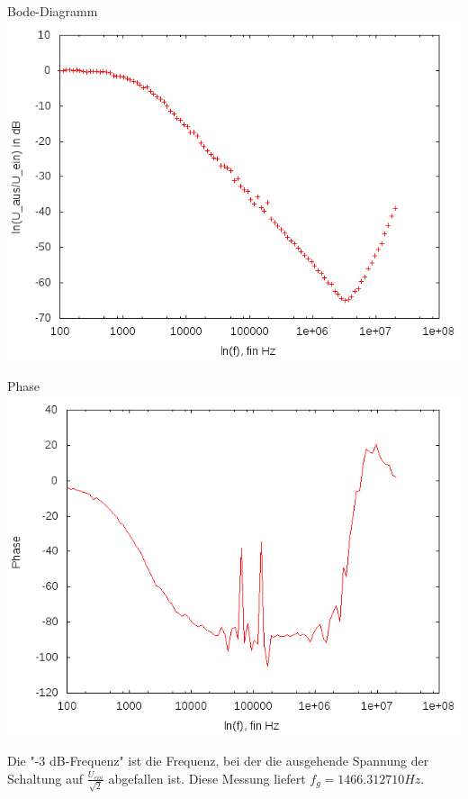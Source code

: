 \documentclass[compress,11pt]{beamer}
\begin{document}
\begin{frame}\begin{block}{Bode-Diagramm}
\centering
\includegraphics[width=.85\textwidth]{../daten/Messdaten/plots/Aufgabe2Bodediagramm_tief_gain}
\end{block}
\end{frame}
\begin{frame}
\begin{block}{Phase}
\includegraphics[width=.85\textwidth]{../daten/Messdaten/plots/Aufgabe2Bodediagramm_tief_phase}

\end{block}
\end{frame}

\begin{frame}
Die "-3 dB-Frequenz" ist die Frequenz, bei der die ausgehende Spannung der Schaltung auf $\frac{U_{ein}}{\sqrt{2}}$ abgefallen ist. Diese Messung liefert $f_g = 1466.312710 Hz$.
\end{frame}
\end{document}
